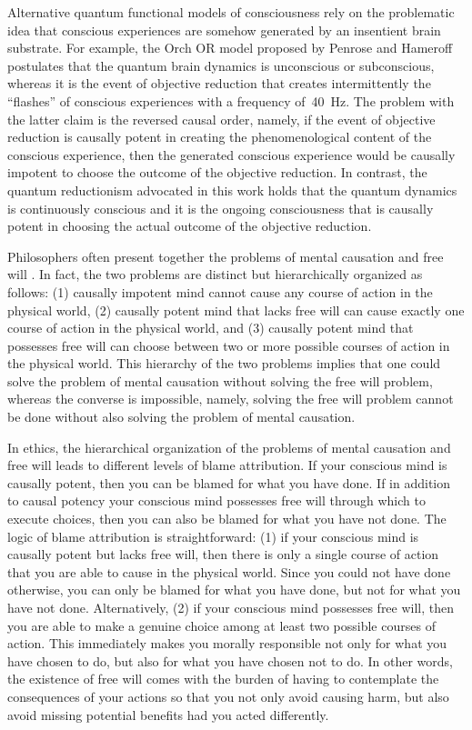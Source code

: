 \documentclass{ws-ijmpb}
\begin{document}
Alternative quantum functional models of consciousness rely on the problematic idea that conscious experiences are somehow generated by an insentient brain substrate. For example, the Orch OR model proposed by Penrose and Hameroff postulates that the quantum brain dynamics is unconscious or subconscious, whereas it is the event of objective reduction that creates intermittently the ``flashes'' of conscious experiences with a frequency of~40~Hz. The problem with the latter claim is the reversed causal order, namely, if the event of objective reduction is causally potent in creating the phenomenological content of the conscious experience, then the generated conscious experience would be causally impotent to choose the outcome of the objective reduction. In contrast, the quantum reductionism advocated in this work holds that the quantum dynamics is continuously conscious and it is the ongoing consciousness that is causally potent in choosing the actual outcome of the objective reduction.

Philosophers often present together the problems of mental causation and free will \cite{Sartorio2016}.
In fact, the two problems are distinct but hierarchically organized as follows:
(1) causally impotent mind cannot cause any course of action in the physical world,
(2) causally potent mind that lacks free will can cause exactly one course of action in the physical world, and
(3) causally potent mind that possesses free will can choose between two or more possible courses of action in the physical world.
This hierarchy of the two problems implies that one could solve the problem of mental causation
without solving the free will problem, whereas the converse is impossible,
namely, solving the free will problem cannot be done without also
solving the problem of mental causation.

In ethics, the hierarchical organization of the problems of mental
causation and free will leads to different levels of blame attribution.
If your conscious mind is causally potent, then you can be
blamed for what you have done. If in addition to causal potency your
conscious mind possesses free will through which to execute choices,
then you can also be blamed for what you have not done. The logic of blame
attribution is straightforward: (1) if your conscious mind is causally
potent but lacks free will, then there is only a single course of
action that you are able to cause in the physical world. Since you
could not have done otherwise, you can only be blamed for what you
have done, but not for what you have not done. Alternatively, (2)
if your conscious mind possesses free will, then you are able to make
a genuine choice among at least two possible courses of action. This
immediately makes you morally responsible not only for what you have
chosen to do, but also for what you have chosen not to do. In other
words, the existence of free will comes with the burden of having
to contemplate the consequences of your actions so that you not only
avoid causing harm, but also avoid missing potential benefits had
you acted differently.
\end{document}
